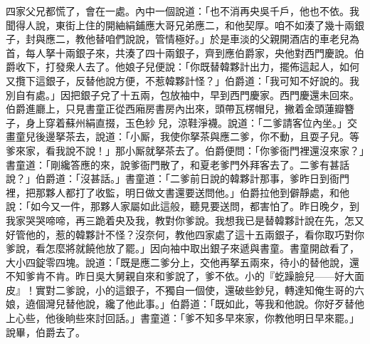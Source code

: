 四家父兄都慌了，會在一處。內中一個說道：「也不消再央吳千戶，他也不依。我聞得人說，東街上住的開紬絹鋪應大哥兄弟應二，和他契厚。咱不如湊了幾十兩銀子，封與應二，教他替咱們說說，管情極好。」於是車淡的父親開酒店的車老兒為首，每人拏十兩銀子來，共湊了四十兩銀子，齊到應伯爵家，央他對西門慶說。伯爵收下，打發衆人去了。他娘子兒便說：「你既替韓夥計出力，擺佈這起人，如何又攬下這銀子，反替他說方便，不惹韓夥計怪？」伯爵道：「我可知不好說的。我別自有處。」因把銀子兌了十五兩，包放袖中，早到西門慶家。西門慶還未回來。伯爵進廳上，只見書童正從西廂房書房內出來，頭帶瓦楞帽兒，撇着金頭蓮瓣簪子，身上穿着蘇州絹直掇，玉色紗𧜽兒，涼鞋淨襪。說道：「二爹請客位內坐。」交畫童兒後邊拏茶去，說道：「小厮，我使你拏茶與應二爹，你不動，且耍子兒。等爹來家，看我說不說！」那小厮就拏茶去了。伯爵便問：「你爹衙門裡還沒來家？」書童道：「剛纔答應的來，說爹衙門散了，和夏老爹門外拜客去了。二爹有甚話說？」伯爵道：「沒甚話。」書童道：「二爹前日說的韓夥計那事，爹昨日到衙門裡，把那夥人都打了收監，明日做文書還要送問他。」伯爵拉他到僻靜處，和他說：「如今又一件，那夥人家屬如此這般，聽見要送問，都害怕了。昨日晚夕，到我家哭哭啼啼，再三跪着央及我，教對你爹說。我想我已是替韓夥計說在先，怎又好管他的，惹的韓夥計不怪？沒奈何，教他四家處了這十五兩銀子，看你取巧對你爹說，看怎麼將就饒他放了罷。」因向袖中取出銀子來遞與書童。書童開啟看了，大小四錠零四塊。說道：「既是應二爹分上，交他再拏五兩來，待小的替他說，還不知爹肯不肯。昨日吳大舅親自來和爹說了，爹不依。小的『虼躁臉兒——好大面皮』！實對二爹說，小的這銀子，不獨自一個使，還破些鈔兒，轉達知俺生哥的六娘，遶個灣兒替他說，纔了他此事。」{}伯爵道：「既如此，等我和他說。你好歹替他上心些，他後晌些來討回話。」書童道：「爹不知多早來家，你教他明日早來罷。」說畢，伯爵去了。


